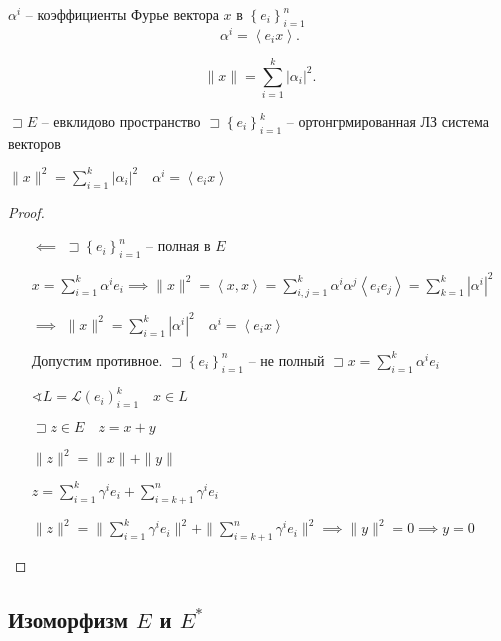 \documentclass{book}
\theoremstyle{definition}
\begin{document}
\begin{definition}
    $\alpha^i$ -- коэффициенты Фурье вектора  $x$ в  $\left\{ e_i \right\} _{i=1}^n$
    \[
    \alpha^i = \left<e_i x \right>
    .\] 
\end{definition}

\begin{theorem}
    \[
    \|x\| = \sum_{i=1}^{k} |\alpha_i|^2
    .\] 
\end{theorem}

\begin{theorem}

    $\sqsupset E$ -- евклидово пространство $ \sqsupset \left\{ e_i \right\} _{i=1}^k$  -- ортонгрмированная ЛЗ система векторов

    $\|x\|^2 = \sum_{i=1}^{k} |\alpha_i|^2\quad \alpha^i = \left<e_i x \right>$
\end{theorem}
\begin{proof}
    \begin{itemize}
        \item []
        \item [$\impliedby $] $\sqsupset \left\{ e_i \right\} _{i=1}^n$ -- полная в $E$

             $x = \sum_{i=1}^{k} \alpha^ie_i \implies \|x\|^2 = \left<x, x \right> = \sum_{i, j = 1}^{k} \alpha^i\alpha^j \left<e_i e_j \right> = \sum_{k=1}^{k} |\alpha^i|^2$ 
         \item [$\implies $] $\|x\|^2 = \sum_{i=1}^{k} |\alpha^i|^2\quad \alpha^i = \left<e_i x \right>$ 

             Допустим противное. $\sqsupset \left\{ e_i \right\} _{i=1}^n $ -- не полный $\sqsupset x = \sum_{i=1}^{k} \alpha^ie_i$ 

             $\sphericalangle L = \mathcal L\left( e_i \right) _{i=1}^k\quad x\in L$

             $\sqsupset z \in E\quad z = x+ y$

             $\|z\|^2 = \|x\| + \|y\|$

             $z = \sum_{i=1}^{k} \gamma^ie_i + \sum_{i=k+1}^{n} \gamma^ie_i$ 

             $\|z\|^2 = \|\sum_{i=1}^{k} \gamma^i e_i\|^2 + \|\sum_{i=k+1}^{n} \gamma^ie_i\|^2 \implies  \|y\|^2 = 0 \implies y = 0$
    \end{itemize}
\end{proof}

\subsection{Изоморфизм $E$ и  $E^*$}
\end{document}
